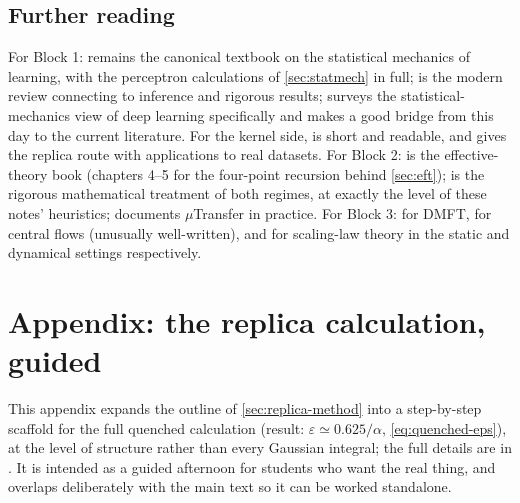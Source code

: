 \documentclass[11pt]{article}
\begin{document}
\subsection{Further reading}

For Block 1: \cite{engel2001statistical} remains the canonical textbook on
the statistical mechanics of learning, with the perceptron calculations of
\cref{sec:statmech} in full; \cite{zdeborova2016statistical} is the modern
review connecting to inference and rigorous results;
\cite{bahri2020statistical} surveys the statistical-mechanics view of deep
learning specifically and makes a good bridge from this day to the current
literature. For the kernel side, \cite{simon2023eigenlearning} is short and
readable, and \cite{canatar2021spectral} gives the replica route with
applications to real datasets. For Block 2:
\cite{roberts2022principles} is the effective-theory book (chapters 4--5
for the four-point recursion behind \cref{sec:eft});
\cite[chs.~19--20]{spiliopoulos2025foundations} is the rigorous
mathematical treatment of both regimes, at exactly the level of these
notes' heuristics; \cite{yang2022tensor} documents $\mu$Transfer in
practice. For Block 3: \cite{bordelon2022self} for DMFT,
\cite{cohen2025understanding} for central flows (unusually well-written),
and \cite{maloney2022solvable,bordelon2024dynamical} for scaling-law
theory in the static and dynamical settings respectively.

\section{Appendix: the replica calculation, guided}
\label{sec:replica-appendix}

This appendix expands the outline of \cref{sec:replica-method} into a
step-by-step scaffold for the full quenched calculation (result:
$\varepsilon \simeq 0.625/\alpha$, \cref{eq:quenched-eps}), at the level of
structure rather than every Gaussian integral; the full details are in
\cite[chs.~2--3]{engel2001statistical}. It is intended as a guided
afternoon for students who want the real thing, and overlaps deliberately
with the main text so it can be worked standalone.
\end{document}
